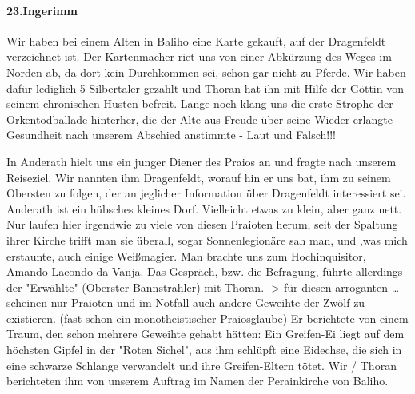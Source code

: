 \paragraph{23.Ingerimm}

Wir haben bei einem Alten in Baliho eine Karte gekauft, auf der Dragenfeldt  verzeichnet ist. Der Kartenmacher riet uns von einer Abkürzung des Weges im Norden ab, da dort kein Durchkommen sei, schon gar nicht zu Pferde. Wir haben dafür lediglich 5 Silbertaler gezahlt und Thoran hat ihn mit Hilfe der Göttin von seinem chronischen Husten befreit. Lange noch klang uns die erste Strophe der Orkentodballade hinterher, die der Alte aus Freude über seine Wieder erlangte Gesundheit nach unserem Abschied anstimmte - Laut und Falsch!!!\par

In Anderath hielt uns ein junger Diener des Praios an und fragte nach unserem Reiseziel. Wir nannten ihm Dragenfeldt, worauf hin er uns bat, ihm zu seinem Obersten zu folgen, der an jeglicher Information über Dragenfeldt  interessiert sei. Anderath ist ein hübsches kleines Dorf. Vielleicht etwas zu klein, aber ganz nett. Nur laufen hier irgendwie zu viele von diesen Praioten herum, seit der Spaltung ihrer Kirche trifft man sie überall, sogar Sonnenlegionäre sah man, und ,was mich erstaunte, auch einige Weißmagier. Man brachte uns zum Hochinquisitor, Amando Lacondo da Vanja. Das Gespräch, bzw. die Befragung, führte allerdings der "Erwählte" (Oberster Bannstrahler) mit Thoran. -> für diesen arroganten \dots scheinen nur Praioten und im Notfall auch andere Geweihte der Zwölf zu existieren. (fast schon ein monotheistischer Praiosglaube) Er berichtete von einem Traum, den schon mehrere Geweihte gehabt hätten: Ein Greifen-Ei liegt auf dem höchsten Gipfel in der "Roten Sichel", aus ihm schlüpft eine Eidechse, die sich in eine schwarze Schlange verwandelt und ihre Greifen-Eltern tötet. Wir / Thoran berichteten ihm von unserem Auftrag im Namen der Perainkirche von Baliho. \par

